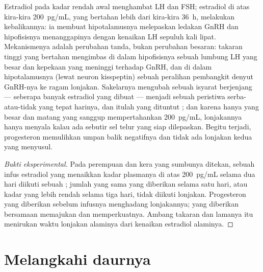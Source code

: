 \begin{theorem}\label{thm:b2:reproductive-hormones:switch}
Estradiol pada kadar rendah awal 
menghambat LH dan FSH; estradiol di atas kira-kira \qty{200}{pg/mL},
yang bertahan lebih dari kira-kira \qty{36}{h}, melakukan kebalikannya:
ia membuat hipotalamusnya melepaskan ledakan GnRH dan hipofisisnya
menanggapinya dengan kenaikan LH sepuluh kali lipat. Mekanismenya
adalah perubahan tanda, bukan perubahan besaran: takaran tinggi yang
bertahan mengimbas di dalam hipofisisnya sebuah lumbung LH yang besar
dan kepekaan yang meninggi terhadap GnRH, dan di dalam hipotalamusnya
(lewat neuron kisspeptin) sebuah peralihan pembangkit denyut GnRH-nya
ke ragam lonjakan. Sakelarnya mengubah sebuah isyarat berjenjang ---
seberapa banyak estradiol yang dibuat  --- menjadi sebuah
peristiwa serba-atau-tidak yang tepat harinya, dan itulah yang dituntut
; dan karena hanya  yang besar dan matang yang sanggup
mempertahankan \qty{200}{pg/mL}, lonjakannya hanya menyala kalau ada
sebutir sel telur yang siap dilepaskan. Begitu  terjadi,
progesteron  memulihkan umpan balik negatifnya dan
tidak ada lonjakan kedua yang menyusul.
\end{theorem}
\begin{proof}[Bukti eksperimental]
Pada perempuan dan kera yang sumbunya ditekan, sebuah infus estradiol
yang menaikkan kadar plasmanya di atas \qty{200}{pg/mL} selama dua hari
diikuti sebuah ; jumlah yang sama yang diberikan selama satu
hari, atau kadar yang lebih rendah selama tiga hari, tidak diikuti
lonjakan. Progesteron yang diberikan sebelum infusnya menghadang
lonjakannya; yang diberikan bersamaan memajukan dan memperkuatnya.
Ambang takaran dan lamanya itu menirukan waktu lonjakan alaminya dari
kenaikan estradiol alaminya.
\end{proof}

\section{Melangkahi daurnya}

